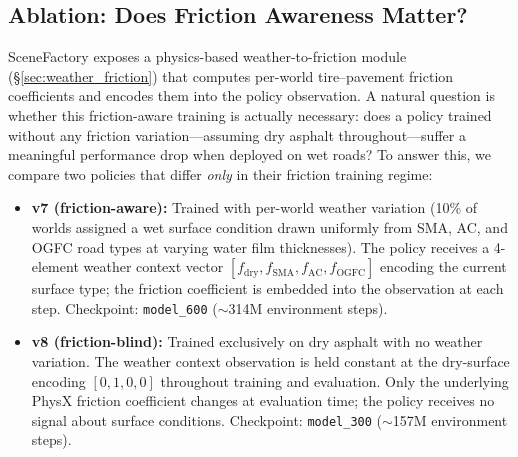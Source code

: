 %
%
%

\subsection{Ablation: Does Friction Awareness Matter?}
\label{sec:ablation_friction}

SceneFactory exposes a physics-based weather-to-friction module (\S\ref{sec:weather_friction}) that computes per-world tire--pavement friction coefficients and encodes them into the policy observation.
A natural question is whether this friction-aware training is actually necessary: does a policy trained without any friction variation---assuming dry asphalt throughout---suffer a meaningful performance drop when deployed on wet roads?
To answer this, we compare two policies that differ \emph{only} in their friction training regime:

\begin{itemize}[leftmargin=*, itemsep=2pt]
  \item \textbf{v7 (friction-aware):} Trained with per-world weather variation (10\% of worlds assigned a wet surface condition drawn uniformly from SMA, AC, and OGFC road types at varying water film thicknesses).
        The policy receives a 4-element weather context vector $[f_\text{dry}, f_\text{SMA}, f_\text{AC}, f_\text{OGFC}]$ encoding the current surface type; the friction coefficient is embedded into the observation at each step.
        Checkpoint: \texttt{model\_600} ($\sim$314M environment steps).
  \item \textbf{v8 (friction-blind):} Trained exclusively on dry asphalt with no weather variation.
        The weather context observation is held constant at the dry-surface encoding $[0,1,0,0]$ throughout training and evaluation.
        Only the underlying PhysX friction coefficient changes at evaluation time; the policy receives no signal about surface conditions.
        Checkpoint: \texttt{model\_300} ($\sim$157M environment steps).
\end{itemize}

